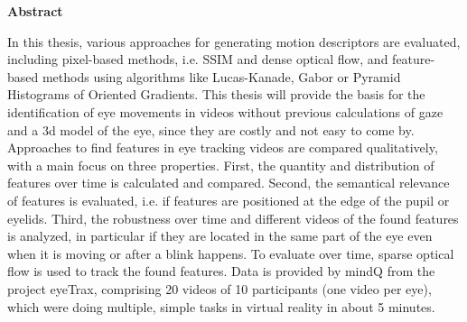 \documentclass[Bachelorarbeit.tex]{subfiles}
\begin{document}
\newpage
\begin{center}
\textbf{Abstract}
\end{center}

In this thesis, various approaches for generating motion descriptors are evaluated, including pixel-based methods, i.e. SSIM and dense optical flow, and feature-based methods using algorithms like Lucas-Kanade, Gabor or Pyramid Histograms of Oriented Gradients. This thesis will provide the basis for the identification of eye movements in videos without previous calculations of gaze and a 3d model of the eye, since they are costly and not easy to come by. 
Approaches to find features in eye tracking videos are compared qualitatively, with a main focus on three properties. First, the quantity and distribution of features over time is calculated and compared. Second, the semantical relevance of features is evaluated, i.e. if features are positioned at the edge of the pupil or eyelids. Third, the robustness over time and different videos of the found features is analyzed, in particular if they are located in the same part of the eye even when it is moving or after a blink happens. To evaluate over time, sparse optical flow is used to track the found features. Data is provided by mindQ from the project eyeTrax, comprising 20 videos of 10 participants (one video per eye), which were doing multiple, simple tasks in virtual reality in about 5 minutes.
\end{document}
